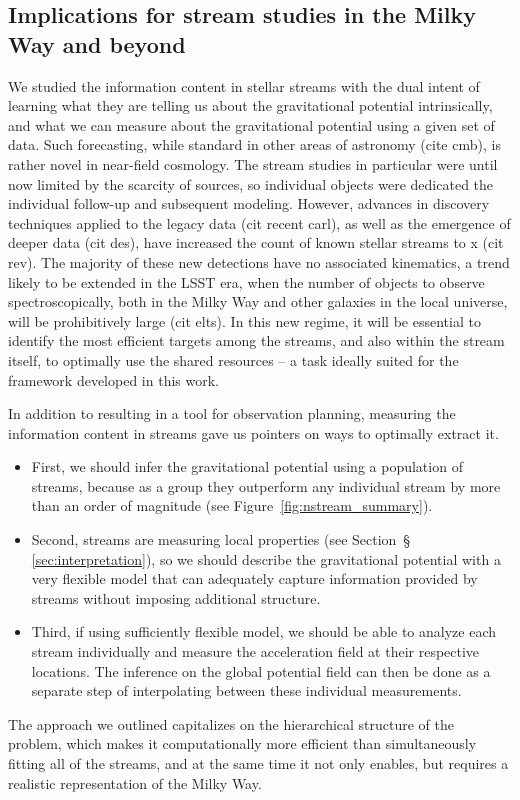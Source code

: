 \documentclass[modern]{aastex61}
\begin{document}
\subsection{Implications for stream studies in the Milky Way and beyond}
\label{sec:dis_applications}
We studied the information content in stellar streams with the dual intent of learning what they are telling us about the gravitational potential intrinsically, and what we can measure about the gravitational potential using a given set of data.
Such forecasting, while standard in other areas of astronomy (cite cmb), is rather novel in near-field cosmology.
The stream studies in particular were until now limited by the scarcity of sources, so individual objects were dedicated the individual follow-up and subsequent modeling.
However, advances in discovery techniques applied to the legacy data (cit recent carl), as well as the emergence of deeper data (cit des), have increased the count of known stellar streams to x (cit rev).
The majority of these new detections have no associated kinematics, a trend likely to be extended in the LSST era, when the number of objects to observe spectroscopically, both in the Milky Way and other galaxies in the local universe, will be prohibitively large (cit elts).
In this new regime, it will be essential to identify the most efficient targets among the streams, and also within the stream itself, to optimally use the shared resources -- a task ideally suited for the framework developed in this work.

In addition to resulting in a tool for observation planning, measuring the information content in streams gave us pointers on ways to optimally extract it.
\begin{itemize}
\item{First, we should infer the gravitational potential using a population of streams, because as a group they outperform any individual stream by more than an order of magnitude (see Figure~\ref{fig:nstream_summary}).}
\item{Second, streams are measuring local properties (see Section~\S\,\ref{sec:interpretation}), so we should describe the gravitational potential with a very flexible model that can adequately capture information provided by streams without imposing additional structure.}
\item{Third, if using sufficiently flexible model, we should be able to analyze each stream individually and measure the acceleration field at their respective locations.
The inference on the global potential field can then be done as a separate step of interpolating between these individual measurements.}
\end{itemize}
The approach we outlined capitalizes on the hierarchical structure of the problem, which makes it computationally more efficient than simultaneously fitting all of the streams, and at the same time it not only enables, but requires a realistic representation of the Milky Way.
\end{document}
